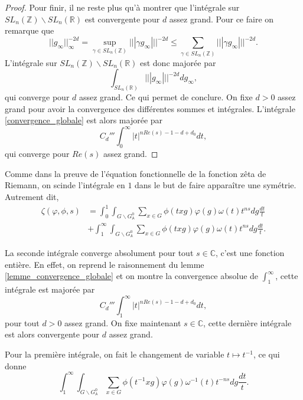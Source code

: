 \begin{proof}
Pour finir, il ne reste plus qu'à montrer que l'intégrale sur $SL_n(\mathbb{Z}) \backslash SL_n(\mathbb{R})$ est convergente pour $d$ assez grand. Pour ce faire on remarque que
\begin{equation}
||g_\infty||^{-2d}_\infty = \sup_{\gamma \in SL_n(\mathbb{Z})} |||\gamma g_\infty|||^{-2d} \leq \sum_{\gamma \in SL_n(\mathbb{Z})} |||\gamma g_\infty|||^{-2d}.
\end{equation}
L'intégrale sur $SL_n(\mathbb{Z}) \backslash SL_n(\mathbb{R})$ est donc majorée par
\begin{equation}
\int_{SL_n(\mathbb{R})} |||g_\infty|||^{-2d} dg_\infty,
\end{equation}
qui converge pour $d$ assez grand. Ce qui permet de conclure. On fixe $d > 0$ assez grand pour avoir la convergence des différentes sommes et intégrales. L'intégrale \ref{convergence_globale} est alors majorée par
\begin{equation}
C_d''' \int_0^\infty |t|^{nRe(s)-1-d+d_0} dt,
\end{equation}
qui converge pour $Re(s)$ assez grand.
\end{proof}

Comme dans la preuve de l'équation fonctionnelle de la fonction zêta de Riemann, on scinde l'intégrale en $1$ dans le but de faire apparaître une symétrie. Autrement dit,
\begin{equation}
\begin{split}
\zeta(\varphi, \phi, s) &= \int_0^1 \int_{G \backslash G^0_\mathbb{A}} \sum_{x \in G}{\phi(txg)} \varphi(g) \omega(t) t^{ns} dg \frac{dt}{t} \\
&+ \int_1^\infty \int_{G \backslash G^0_\mathbb{A}} \sum_{x \in G}{\phi(txg)} \varphi(g) \omega(t) t^{ns} dg \frac{dt}{t}.
\end{split}
\end{equation}

La seconde intégrale converge absolument pour tout $s \in \mathbb{C}$, c'est une fonction entière. En effet, on reprend le raisonnement du lemme \ref{lemme_convergence_globale} et on montre la convergence absolue de $\int_1^\infty$, cette intégrale est majorée par
\begin{equation}
C_d''' \int_1^\infty |t|^{nRe(s)-1-d+d_0} dt,
\end{equation}
pour tout $d > 0$ assez grand. On fixe maintenant $s \in \mathbb{C}$, cette dernière intégrale est alors convergente pour $d$ assez grand.

Pour la première intégrale, on fait le changement de variable $t \mapsto t^{-1}$, ce qui donne
\begin{equation}
\int_1^\infty \int_{G \backslash G^0_\mathbb{A}} \sum_{x \in G}{\phi(t^{-1}xg)} \varphi(g) \omega^{-1}(t) t^{-ns} dg \frac{dt}{t}.
\end{equation}

